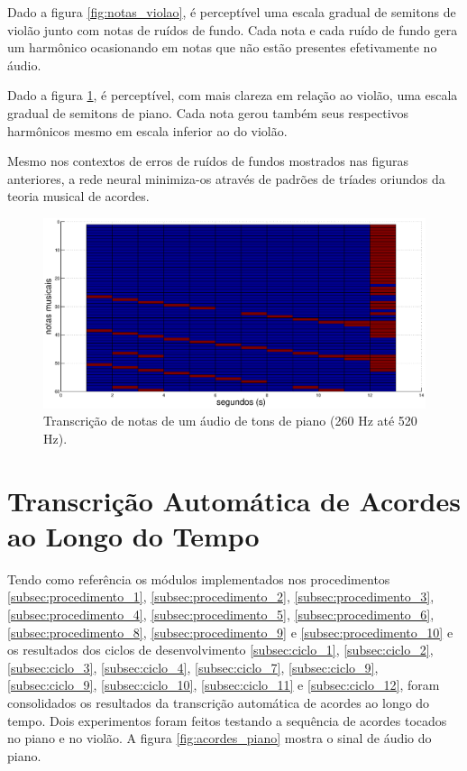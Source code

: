 Dado a figura \ref{fig:notas_violao}, é perceptível uma escala gradual de semitons de violão junto com notas de ruídos de fundo. Cada nota e cada ruído de fundo gera um harmônico ocasionando em notas que não estão presentes efetivamente no áudio.

Dado a figura \ref{fig:notas_piano}, é perceptível, com mais clareza em relação ao violão, uma escala gradual de semitons de piano. Cada nota gerou também seus respectivos harmônicos mesmo em escala inferior ao do violão.

Mesmo nos contextos de erros de ruídos de fundos mostrados nas figuras anteriores, a rede neural minimiza-os através de padrões de tríades oriundos da teoria musical de acordes.

\begin{figure}[h]
    \centering
    \includegraphics[keepaspectratio=true,scale=0.5]{figuras/notas_piano.eps}
  \caption{Transcrição de notas de um áudio de tons de piano (260 Hz até 520 Hz).}
  \label{fig:notas_piano}
\end{figure}


\section{Transcrição Automática de Acordes ao Longo do Tempo}
Tendo como referência os módulos implementados nos procedimentos \ref{subsec:procedimento_1}, \ref{subsec:procedimento_2}, \ref{subsec:procedimento_3}, \ref{subsec:procedimento_4}, \ref{subsec:procedimento_5}, \ref{subsec:procedimento_6}, \ref{subsec:procedimento_8}, \ref{subsec:procedimento_9} e \ref{subsec:procedimento_10} e os resultados dos ciclos de desenvolvimento \ref{subsec:ciclo_1}, \ref{subsec:ciclo_2}, \ref{subsec:ciclo_3}, \ref{subsec:ciclo_4}, \ref{subsec:ciclo_7}, \ref{subsec:ciclo_9}, \ref{subsec:ciclo_9}, \ref{subsec:ciclo_10}, \ref{subsec:ciclo_11} e \ref{subsec:ciclo_12}, foram consolidados os resultados da transcrição automática de acordes ao longo do tempo. Dois experimentos foram feitos testando a sequência de acordes tocados no piano e no violão. A figura \ref{fig:acordes_piano} mostra o sinal de áudio do piano.


